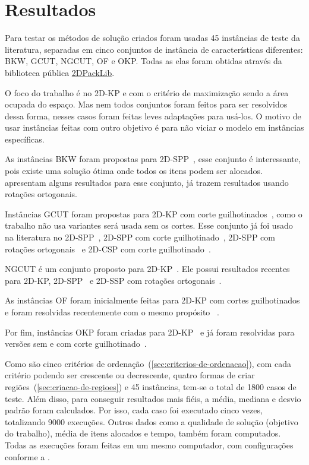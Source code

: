 \chapter{Resultados}\label{ch:resultados}

Para testar os métodos de solução criados foram usadas 45 instâncias de teste da literatura,
separadas em cinco conjuntos de instância de características diferentes:
BKW, GCUT, NGCUT, OF e OKP\@.
Todas as elas foram obtidas através da biblioteca pública
\href{https://site.unibo.it/operations-research/en/research/2dpacklib}{2DPackLib}.

O foco do trabalho é no 2D-KP e com o critério de maximização sendo a área ocupada do espaço.
Mas nem todos conjuntos foram feitos para ser resolvidos dessa forma, nesses casos foram
feitas leves adaptações para usá-los.
O motivo de usar instâncias feitas com outro objetivo é para não viciar o modelo em instâncias
específicas.

As instâncias BKW foram propostas para 2D-SPP~\cite{burke2004new}, esse conjunto é interessante, pois
existe uma solução ótima onde todos os itens podem ser alocados.
\citeauthor*{cote2014combinatorial} apresentam alguns resultados para esse conjunto, já
\citeauthor*{delorme2017logic} trazem resultados usando rotações ortogonais.

Instâncias GCUT foram propostas para 2D-KP com corte guilhotinados~\cite{beasley1985algorithms},
como o trabalho não usa variantes será usada sem os cortes.
Esse conjunto já foi usado na literatura no 2D-SPP~\cite{cote2014combinatorial},
2D-SPP com corte guilhotinado~\cite{mrad2015arc}, 2D-SPP com rotações ortogonais~\cite{delorme2017logic}
e 2D-CSP com corte guilhotinado~\cite{cintra2008algorithms}.

NGCUT é um conjunto proposto para 2D-KP~\cite{beasley1985exact}.
Ele possui resultados recentes para 2D-KP, 2D-SPP~\cite{cote2014combinatorial} e 2D-SSP com
rotações ortogonais~\cite{delorme2017logic}.

As instâncias OF foram inicialmente feitas para 2D-KP com cortes
guilhotinados~\cite{oliveira1990improved} e foram resolvidas recentemente com o mesmo propósito
~\cite{velasco2019improved, martin2020models}.

Por fim, instâncias OKP foram criadas para 2D-KP~\cite{fekete1997new} e já foram resolvidas para
versões sem e com corte guilhotinado~\cite{furini2016modeling}.

Como são cinco critérios de ordenação~(\cref{sec:criterios-de-ordenacao}), com cada critério
podendo ser crescente ou decrescente, quatro formas de criar regiões~(\cref{sec:criacao-de-regioes})
e 45 instâncias, tem-se o total de 1800 casos de teste.
Além disso, para conseguir resultados mais fiéis, a média, mediana e desvio padrão foram calculados.
Por isso, cada caso foi executado cinco vezes, totalizando 9000 execuções.
Outros dados como a qualidade de solução (objetivo do trabalho), média de itens alocados e tempo,
também foram computados.
Todas as execuções foram feitas em um mesmo computador, com configurações conforme a
.

